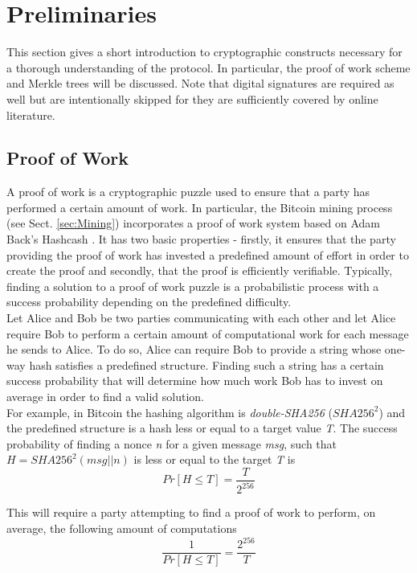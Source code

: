\section{Preliminaries} \label{sec:Preliminaries}
This section gives a short introduction to cryptographic constructs necessary for a thorough understanding of the protocol. In particular, the proof of work scheme and Merkle trees will be discussed. Note that digital signatures are required as well but are intentionally skipped for they are sufficiently covered by online literature.

\subsection{Proof of Work} \label{sec:ProofOfWork}
A proof of work is a cryptographic puzzle used to ensure that a party has performed a certain amount of work. In particular, the Bitcoin mining process (see Sect. \ref{sec:Mining}) incorporates a proof of work system based on Adam Back's Hashcash \cite{Back_Hashcash}. It has two basic properties - firstly, it ensures that the party providing the proof of work has invested a predefined amount of effort in order to create the proof and secondly, that the proof is efficiently verifiable. Typically, finding a solution to a proof of work puzzle is a probabilistic process with a success probability depending on the predefined difficulty.~\\

\noindent
Let Alice and Bob be two parties communicating with each other and let Alice require Bob to perform a certain amount of computational work for each message he sends to Alice. To do so, Alice can require Bob to provide a string whose one-way hash satisfies a predefined structure. Finding such a string has a certain success probability that will determine how much work Bob has to invest on average in order to find a valid solution.~\\

\noindent
For example, in Bitcoin the hashing algorithm is \emph{double-SHA256} ($\mathit{SHA256^{2}}$) and the predefined structure is a hash less or equal to a target value \emph{T}. The success probability of finding a nonce \emph{n} for a given message \emph{msg}, such that $\mathit{H = SHA256^{2}(msg||n)}$ is less or equal to the target \emph{T} is
\begin{equation}
Pr[H \leq T] = \frac{T}{2^{256}}
\end{equation}

\noindent
This will require a party attempting to find a proof of work to perform, on average, the following amount of computations
\begin{equation}
\frac{1}{Pr[H \leq T]} = \frac{2^{256}}{T}
\end{equation}

